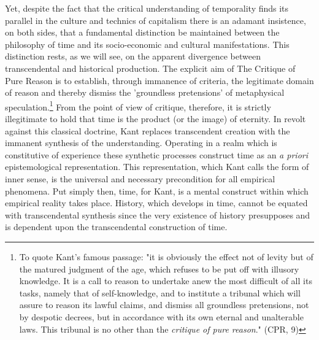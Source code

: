 Yet, despite the fact that the critical understanding of temporality finds its parallel in the culture and technics of capitalism there is an adamant insistence, on both sides, that a fundamental distinction be maintained between the philosophy of time and its socio-economic and cultural manifestations. This distinction rests, as we will see, on the apparent divergence between transcendental and historical production. The explicit aim of The Critique of Pure Reason is to establish, through immanence of criteria, the legitimate domain of reason and thereby dismiss the 'groundless pretensions' of metaphysical speculation.\footnote{To quote Kant's famous passage: "it is obviously the effect not of levity but of the matured judgment of the age, which refuses to be put off with illusory knowledge. It is a call to reason to undertake anew the most difficult of all its tasks, namely that of self-knowledge, and to institute a tribunal which will assure to reason its lawful claims, and dismiss all groundless pretensions, not by despotic decrees, but in accordance with its own eternal and unalterable laws. This tribunal is no other than the \textit{critique of pure reason}." (CPR, 9)} From the point of view of critique, therefore, it is strictly illegitimate to hold that time is the product (or the image) of eternity. In revolt against this classical doctrine, Kant replaces transcendent creation with the immanent synthesis of the understanding. Operating in a realm which is constitutive of experience these synthetic processes construct time as an \textit{a priori} epistemological representation. This representation, which Kant calls the form of inner sense, is the universal and necessary precondition for all empirical phenomena. Put simply then, time, for Kant, is a mental construct within which empirical reality takes place. History, which develops in time, cannot be equated with transcendental synthesis since the very existence of history presupposes and is dependent upon the transcendental construction of time. 